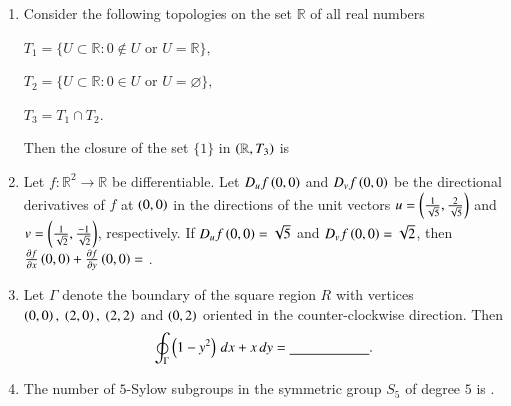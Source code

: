 \documentclass[journal,12pt,onecolumn]{IEEEtran}
\theoremstyle{remark}
\begin{document}
\begin{enumerate}[start=1, label=Q.\arabic*]
\hfill{}


\item Consider the following topologies on the set $\mathbb{R}$ of all real numbers\brak{:}

$T_{1}=\{U \subset \mathbb{R} : 0 \notin U \text{ or } U=\mathbb{R}\},$  

$T_{2}=\{U \subset \mathbb{R} : 0 \in U \text{ or } U=\varnothing\},$  

$T_{3}=T_{1} \cap T_{2}$.  

Then the closure of the set $\{1\}$ in $\left(\mathbb{R},T_{3}\right)$ is
\begin{enumerate}
\end{enumerate}

\hfill{}
\item Let $f : \mathbb{R}^{2}\to \mathbb{R}$ be differentiable.  
Let $D_{u}f\left(0,0\right)$ and $D_{v}f\left(0,0\right)$ be the directional derivatives of $f$ at $\left(0,0\right)$ in the directions of the unit vectors 
$u=\left(\tfrac{1}{\sqrt{5}},\tfrac{2}{\sqrt{5}}\right)$ and $v=\left(\tfrac{1}{\sqrt{2}},\tfrac{-1}{\sqrt{2}}\right)$, respectively.  
If $D_{u}f\left(0,0\right)=\sqrt{5}$ and $D_{v}f\left(0,0\right)=\sqrt{2}$, then $\tfrac{\partial f}{\partial x}\left(0,0\right)+\tfrac{\partial f}{\partial y}\left(0,0\right)=$ \underline{\hspace{2cm}}.

\hfill{}


\item Let $\Gamma$ denote the boundary of the square region $R$ with vertices $\brak{0,0},\ \brak{2,0},\ \brak{2,2}$ and $\left(0,2\right)$ oriented in the counter\mbox{-}clockwise direction.  
Then
\[
\oint_{\Gamma}\left(1-y^{2}\right)\,dx+x\,dy=\underline{\hspace{2cm}}.
\]

\hfill{}


\item The number of $5$\mbox{-}Sylow subgroups in the symmetric group $S_{5}$ of degree $5$ is \underline{\hspace{2cm}}.

\hfill{}



\end{enumerate}
\end{document}
